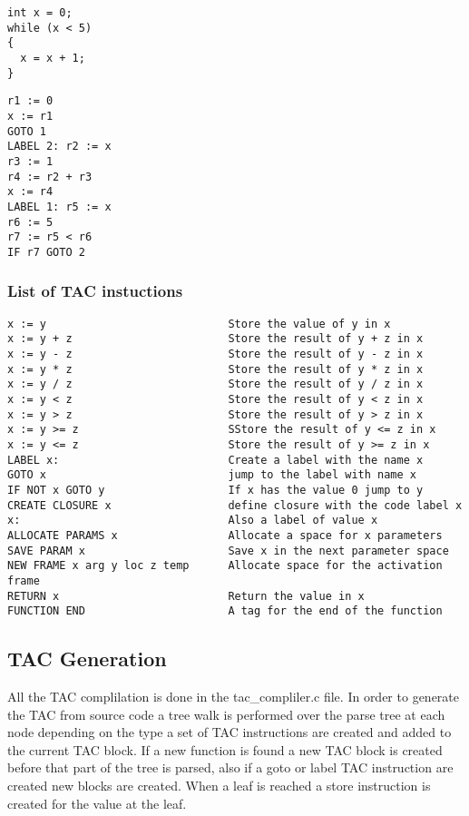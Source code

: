 \documentclass{article}
\begin{document}
\begin{lstlisting}
int x = 0;
while (x < 5)
{
  x = x + 1;
}
\end{lstlisting}

\begin{lstlisting}
r1 := 0
x := r1
GOTO 1
LABEL 2: r2 := x
r3 := 1
r4 := r2 + r3
x := r4
LABEL 1: r5 := x
r6 := 5
r7 := r5 < r6
IF r7 GOTO 2
\end{lstlisting}

\subsubsection{List of TAC instuctions}
\begin{lstlisting}
x := y                            Store the value of y in x
x := y + z                        Store the result of y + z in x
x := y - z                        Store the result of y - z in x
x := y * z                        Store the result of y * z in x
x := y / z                        Store the result of y / z in x
x := y < z                        Store the result of y < z in x
x := y > z                        Store the result of y > z in x
x := y >= z                       SStore the result of y <= z in x
x := y <= z                       Store the result of y >= z in x
LABEL x:                          Create a label with the name x
GOTO x                            jump to the label with name x
IF NOT x GOTO y                   If x has the value 0 jump to y
CREATE CLOSURE x                  define closure with the code label x
x:                                Also a label of value x
ALLOCATE PARAMS x                 Allocate a space for x parameters
SAVE PARAM x                      Save x in the next parameter space
NEW FRAME x arg y loc z temp      Allocate space for the activation frame
RETURN x                          Return the value in x
FUNCTION END                      A tag for the end of the function
\end{lstlisting}


\subsection{TAC Generation}

All the TAC complilation is done in the tac\_compliler.c file.
In order to generate the TAC from source code a tree walk is performed over the
parse tree at each node depending on the type a set of TAC instructions are created
and added to the current TAC block. If a new function is found a new TAC block is
created before that part of the tree is parsed, also if a goto or label TAC instruction
are created new blocks are created. When a leaf is reached a store instruction is
created for the value at the leaf.\\~\\
\end{document}
